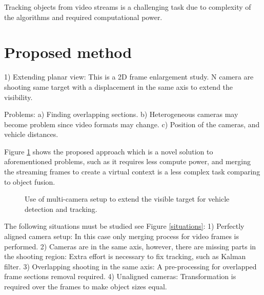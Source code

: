 \documentclass[5p,twocolumn,english]{elsarticle}
\begin{document}
Tracking objects from video streams is a challenging task due to complexity of the algorithms and required computational power.

\section{Proposed method}
\label{sec_method}

1) Extending planar view: This is a 2D frame enlargement study. N camera are shooting same target with a displacement in the same axis to extend the visibility.

Problems: a) Finding overlapping sections. b) Heterogeneous cameras may become problem since video formats may change. c) Position of the cameras, and vehicle distances.

Figure \ref{fig3} shows the proposed approach which is a novel solution to aforementioned problems, such as it requires less compute power, and merging the streaming frames to create a virtual context is a less complex task comparing to object fusion.

\begin{figure}[t]
	\centering
	\caption{Use of multi-camera setup to extend the visible target for vehicle detection and tracking.}
	\label{fig3}
\end{figure}


The following situations must be studied see Figure \ref{situations}:
1) Perfectly aligned camera setup: In this case only merging process for video frames is performed.
2) Cameras are in the same axis, however, there are missing parts in the shooting region: Extra effort is necessary to fix tracking, such as Kalman filter.
3) Overlapping shooting in the same axis: A pre-processing for overlapped frame sections removal required.
4) Unaligned cameras: Transformation is required over the frames to make object sizes equal.

\end{document}
